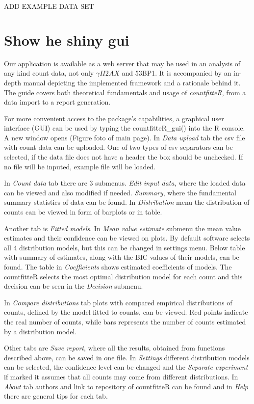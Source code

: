 ADD EXAMPLE DATA SET

\section{Show he shiny gui}

Our application is available as a web server that may be used in an analysis of any kind count data, not only $\gamma H2AX$ and 53BP1. It is accompanied by an in-depth manual depicting the implemented framework and a rationale behind it. The guide covers both theoretical fundamentals and usage of \emph{countfitteR}, from a data import to a report generation.

For more convenient access to the package’s capabilities, a graphical user interface (GUI) can be used by typing the countfitteR\_gui() into the R console. A new window opens (Figure foto of main page). In \textit{Data upload} tab the csv file with count data can be uploaded. One of two types of csv separators can be selected, if the data file does not have a header the box should be unchecked. If no file will be inputed, example file will be loaded.

In \textit{Count data} tab there are 3 submenus. \textit{Edit input data}, where the loaded data can be viewed and also modified if needed. \textit{Summary}, where the fundamental summary statistics of data can be found. In \textit{Distribution} menu the distribution of counts can be viewed in form of barplots or in table.

Another tab is \textit{Fitted models}. In \textit{Mean value estimate} submenu the mean value estimates and their confidence can be viewed on  plots. By default software selects all 4 distribution models, but this can be changed in settings menu. Below table with summary of estimates, along with the BIC values of their models, can be found. The table in \textit{Coefficients} shows estimated coefficients of models. The countfitteR selects the most optimal distribution model for each count and this decision can be seen in the \textit{Decision} submenu.

In \textit{Compare distributions} tab plots with compared empirical distributions of counts, defined by the model fitted to counts, can be viewed. Red points indicate the real number of counts, while bars represents the number of counts estimated by a distribution model.

Other tabs are \textit{Save report}, where all the results, obtained from functions described above, can be saved in one file. In \textit{Settings} different distribution models can be selected, the confidence level can be changed and the \textit{Separate experiment} if marked it assumes that all counts may come from different distributions. In \textit{About} tab authors and link to repository of countfitteR can be found and in \textit{Help} there are general tips for each tab. 

